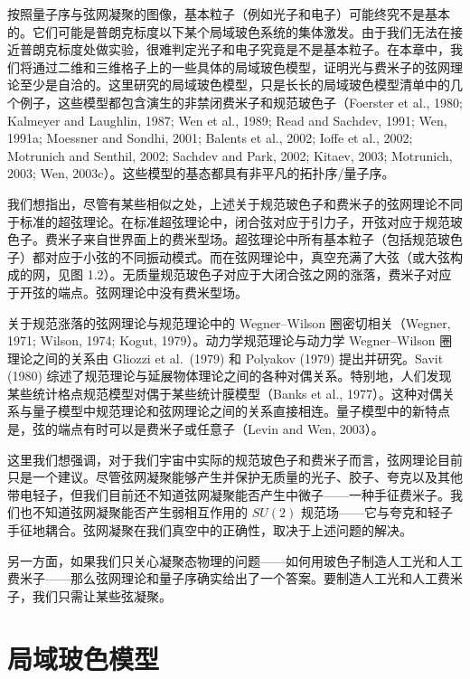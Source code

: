 按照量子序与弦网凝聚的图像，基本粒子（例如光子和电子）可能终究不是基本的。它们可能是普朗克标度以下某个局域玻色系统的集体激发。由于我们无法在接近普朗克标度处做实验，很难判定光子和电子究竟是不是基本粒子。在本章中，我们将通过二维和三维格子上的一些具体的局域玻色模型，证明光与费米子的弦网理论至少是自洽的。这里研究的局域玻色模型，只是长长的局域玻色模型清单中的几个例子，这些模型都包含演生的非禁闭费米子和规范玻色子（Foerster et al., 1980; Kalmeyer and Laughlin, 1987; Wen et al., 1989; Read and Sachdev, 1991; Wen, 1991a; Moessner and Sondhi, 2001; Balents et al., 2002; Ioffe et al., 2002; Motrunich and Senthil, 2002; Sachdev and Park, 2002; Kitaev, 2003; Motrunich, 2003; Wen, 2003c）。这些模型的基态都具有非平凡的拓扑序/量子序。

\begin{smallnote}
我们想指出，尽管有某些相似之处，上述关于规范玻色子和费米子的弦网理论不同于标准的超弦理论。在标准超弦理论中，闭合弦对应于引力子，开弦对应于规范玻色子。费米子来自世界面上的费米型场。超弦理论中所有基本粒子（包括规范玻色子）都对应于小弦的不同振动模式。而在弦网理论中，真空充满了大弦（或大弦构成的网，见图 1.2）。无质量规范玻色子对应于大闭合弦之网的涨落，费米子对应于开弦的端点。弦网理论中没有费米型场。

关于规范涨落的弦网理论与规范理论中的 Wegner--Wilson 圈密切相关（Wegner, 1971; Wilson, 1974; Kogut, 1979）。动力学规范理论与动力学 Wegner--Wilson 圈理论之间的关系由 Gliozzi et al.~(1979) 和 Polyakov (1979) 提出并研究。Savit (1980) 综述了规范理论与延展物体理论之间的各种对偶关系。特别地，人们发现某些统计格点规范模型对偶于某些统计膜模型（Banks et al., 1977）。这种对偶关系与量子模型中规范理论和弦网理论之间的关系直接相连。量子模型中的新特点是，弦的端点有时可以是费米子或任意子（Levin and Wen, 2003）。
\end{smallnote}

这里我们想强调，对于我们宇宙中实际的规范玻色子和费米子而言，弦网理论目前只是一个建议。尽管弦网凝聚能够产生并保护无质量的光子、胶子、夸克以及其他带电轻子，但我们目前还不知道弦网凝聚能否产生中微子——一种手征费米子。我们也不知道弦网凝聚能否产生弱相互作用的 $SU(2)$ 规范场——它与夸克和轻子手征地耦合。弦网凝聚在我们真空中的正确性，取决于上述问题的解决。

另一方面，如果我们只关心凝聚态物理的问题——如何用玻色子制造人工光和人工费米子——那么弦网理论和量子序确实给出了一个答案。要制造人工光和人工费米子，我们只需让某些弦凝聚。

\section{局域玻色模型}

